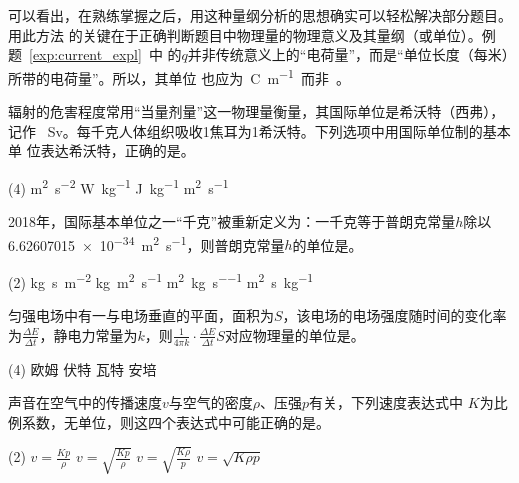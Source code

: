 可以看出，在熟练掌握之后，用这种量纲分析的思想确实可以轻松解决部分题目。用此方法
的关键在于正确判断题目中物理量的物理意义及其量纲（或单位）。例题~\ref{exp:current_expl}~中
的$q$并非传统意义上的“电荷量”，而是“单位长度（每米）所带的电荷量”。所以，其单位
也应为~\unit{\coulomb\per\m}~而非~\unit{\C}。


\begin{exercises}
\item 辐射的危害程度常用“当量剂量”这一物理量衡量，其国际单位是希沃特（西弗），记作
    ~\unit{Sv}。每千克人体组织吸收1焦耳为1希沃特。下列选项中用国际单位制的基本单
    位表达希沃特，正确的是\choiceblank。
    \begin{tasks}(4)
        \task \unit{\square\m\per\square\s}
        \task \unit{\W\per\kg}
        \task \unit{\J\per\kg}
        \task \unit{\square\m\per\s}
    \end{tasks}

\item 2018年，国际基本单位之一“千克”被重新定义为：一千克等于普朗克常量$h$除以
    \qty{6.62607015e-34}{\square\m\per\s}，则普朗克常量$h$的单位是\choiceblank。
    \begin{tasks}(2)
        \task \unit{\kg\s\per\square\m}
        \task \unit{\kg\square\m\per\s}
        \task \unit{\square\m\per\kg\per\s}
        \task \unit{\square\m\s\per\kg}
    \end{tasks}

\item 匀强电场中有一与电场垂直的平面，面积为$S$，该电场的电场强度随时间的变化率
    为$\frac{\Delta E}{\Delta t}$，静电力常量为$k$，则$\frac{1}{4 \pi k}
    \cdot\frac{\Delta E}{\Delta t}S$对应物理量的单位是\choiceblank。
    \begin{tasks}(4)
        \task 欧姆
        \task 伏特
        \task 瓦特
        \task 安培
    \end{tasks}

\item 声音在空气中的传播速度$v$与空气的密度$\rho $、压强$p$有关，下列速度表达式中
    $K$为比例系数，无单位，则这四个表达式中可能正确的是\choiceblank。
    \begin{tasks}(2)
        \task $v=\frac{Kp}{\rho }$
        \task $v=\sqrt{\frac{Kp}{\rho }} $
        \task $v=\sqrt{\frac{K \rho }{p}} $
        \task $v=\sqrt{K \rho p} $
    \end{tasks}


\end{exercises}
